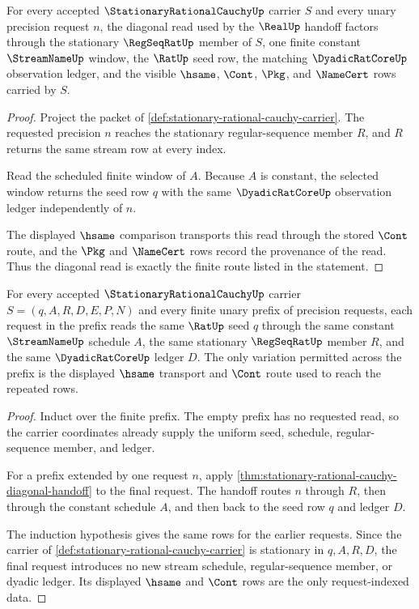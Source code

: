 \begin{theorem}
\label{thm:stationary-rational-cauchy-diagonal-handoff}
For every accepted $\StationaryRationalCauchyUp$ carrier $S$ and every unary precision request $n$, the diagonal read used by the $\RealUp$ handoff factors through the stationary $\RegSeqRatUp$ member of $S$, one finite constant $\StreamNameUp$ window, the $\RatUp$ seed row, the matching $\DyadicRatCoreUp$ observation ledger, and the visible $\hsame$, $\Cont$, $\Pkg$, and $\NameCert$ rows carried by $S$.
\end{theorem}
\begin{proof}
Project the packet of \autoref{def:stationary-rational-cauchy-carrier}. The requested precision $n$ reaches the stationary regular-sequence member $R$, and $R$ returns the same stream row at every index.

Read the scheduled finite window of $A$. Because $A$ is constant, the selected window returns the seed row $q$ with the same $\DyadicRatCoreUp$ observation ledger independently of $n$.

The displayed $\hsame$ comparison transports this read through the stored $\Cont$ route, and the $\Pkg$ and $\NameCert$ rows record the provenance of the read. Thus the diagonal read is exactly the finite route listed in the statement.
\end{proof}

\begin{theorem}
\label{thm:stationary-rational-cauchy-finite-prefix-uniformity}
For every accepted $\StationaryRationalCauchyUp$ carrier $S=(q,A,R,D,E,P,N)$ and every finite unary prefix of precision requests, each request in the prefix reads the same $\RatUp$ seed $q$ through the same constant $\StreamNameUp$ schedule $A$, the same stationary $\RegSeqRatUp$ member $R$, and the same $\DyadicRatCoreUp$ ledger $D$. The only variation permitted across the prefix is the displayed $\hsame$ transport and $\Cont$ route used to reach the repeated rows.
\end{theorem}
\begin{proof}
Induct over the finite prefix. The empty prefix has no requested read, so the carrier coordinates already supply the uniform seed, schedule, regular-sequence member, and ledger.

For a prefix extended by one request $n$, apply \autoref{thm:stationary-rational-cauchy-diagonal-handoff} to the final request. The handoff routes $n$ through $R$, then through the constant schedule $A$, and then back to the seed row $q$ and ledger $D$.

The induction hypothesis gives the same rows for the earlier requests. Since the carrier of \autoref{def:stationary-rational-cauchy-carrier} is stationary in $q,A,R,D$, the final request introduces no new stream schedule, regular-sequence member, or dyadic ledger. Its displayed $\hsame$ and $\Cont$ rows are the only request-indexed data.
\end{proof}

